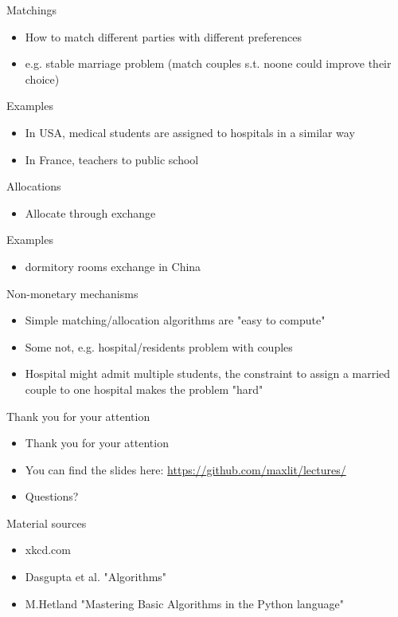 \documentclass[presentation]{beamer}
\begin{document}
\begin{frame}[label=sec-3-22]{Matchings}
\begin{itemize}
\item How to match different parties with different preferences
\item e.g. stable marriage problem (match couples s.t. noone could improve their choice)
\end{itemize}
\begin{block}{Examples}
\begin{itemize}
\item In USA, medical students are assigned to hospitals in a similar way
\item In France, teachers to public school
\end{itemize}
\end{block}
\end{frame}
\begin{frame}[label=sec-3-23]{Allocations}
\begin{itemize}
\item Allocate through exchange
\end{itemize}
\begin{block}{Examples}
\begin{itemize}
\item dormitory rooms exchange in China
\end{itemize}
\end{block}
\end{frame}
\begin{frame}[label=sec-3-24]{Non-monetary mechanisms}
\begin{itemize}
\item Simple matching/allocation algorithms are "easy to compute"
\item Some not, e.g. hospital/residents problem with couples
\item Hospital might admit multiple students, the constraint to assign a married couple to one hospital makes the problem "hard"
\end{itemize}
\end{frame}
\begin{frame}[label=sec-3-25]{Thank you for your attention}
\begin{itemize}
\item Thank you for your attention
\item You can find the slides here: \url{https://github.com/maxlit/lectures/}
\item Questions?
\end{itemize}
\end{frame}
\begin{frame}[label=sec-3-26]{Material sources}
\begin{itemize}
\item xkcd.com
\item Dasgupta et al. "Algorithms"
\item M.Hetland "Mastering Basic Algorithms in the Python language"
\end{itemize}
\end{frame}
\end{document}
